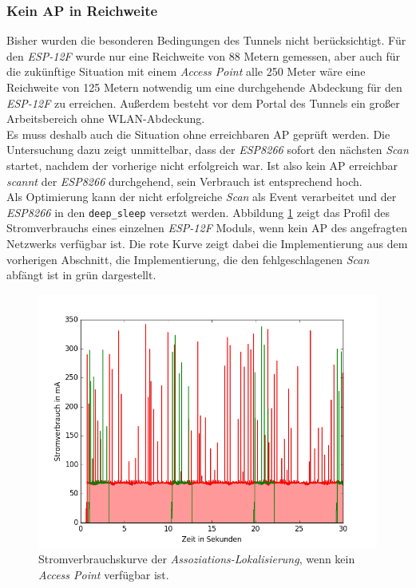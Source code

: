 \subsubsection{Kein AP in Reichweite}
Bisher wurden die besonderen Bedingungen des Tunnels nicht berücksichtigt.
Für den \emph{ESP-12F} wurde nur eine Reichweite von 88 Metern gemessen, aber auch für die zukünftige Situation mit einem \emph{Access Point} alle 250 Meter wäre eine Reichweite von 125 Metern notwendig um eine durchgehende Abdeckung für den \emph{ESP-12F} zu erreichen.
Außerdem besteht vor dem Portal des Tunnels ein großer Arbeitsbereich ohne WLAN-Abdeckung.\\
Es muss deshalb auch die Situation ohne erreichbaren AP geprüft werden.
Die Untersuchung dazu zeigt unmittelbar, dass der \emph{ESP8266} sofort den nächsten \emph{Scan} startet, nachdem der vorherige nicht erfolgreich war.
Ist also kein AP erreichbar \emph{scannt} der \emph{ESP8266} durchgehend, sein Verbrauch ist entsprechend hoch.\\
Als Optimierung kann der nicht erfolgreiche \emph{Scan} als Event verarbeitet und der \emph{ESP8266} in den \texttt{deep\_sleep} versetzt werden.
Abbildung \ref{fig:noap} zeigt das Profil des Stromverbrauchs eines einzelnen \emph{ESP-12F} Moduls, wenn kein AP des angefragten Netzwerks verfügbar ist.
Die rote Kurve zeigt dabei die Implementierung aus dem vorherigen Abschnitt, die Implementierung, die den fehlgeschlagenen \emph{Scan} abfängt ist in grün dargestellt.

\begin{figure}[h!]
  \centering
	\includegraphics[width=\textwidth]{plots/noap.png}
  \caption{Stromverbrauchskurve der \emph{Assoziations-Lokalisierung}, wenn kein \emph{Access Point} verfügbar ist.}
  \label{fig:noap}
\end{figure}


